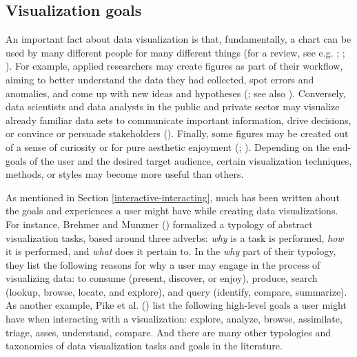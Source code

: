 \documentclass[
  openany]{book}
\theoremstyle{definition}
\theoremstyle{definition}
\theoremstyle{definition}
\theoremstyle{definition}
\theoremstyle{remark}
\begin{document}
\subsection{Visualization goals}\label{visualization-goals}

An important fact about data visualization is that, fundamentally, a chart can be used by many different people for many different things (for a review, see e.g. ; ; ). For example, applied researchers may create figures as part of their workflow, aiming to better understand the data they had collected, spot errors and anomalies, and come up with new ideas and hypotheses (; see also ). Conversely, data scientists and data analysts in the public and private sector may visualize already familiar data sets to communicate important information, drive decisions, or convince or persuade stakeholders (). Finally, some figures may be created out of a sense of curiosity or for pure aesthetic enjoyment (; ). Depending on the end-goals of the user and the desired target audience, certain visualization techniques, methods, or styles may become more useful than others.

As mentioned in Section \ref{interactive-interacting}, much has been written about the goals and experiences a user might have while creating data visualizations. For instance, Brehmer and Munzner () formalized a typology of abstract visualization tasks, based around three adverbs: \emph{why} is a task is performed, \emph{how} it is performed, and \emph{what} does it pertain to. In the \emph{why} part of their typology, they list the following reasons for why a user may engage in the process of visualizing data: to consume (present, discover, or enjoy), produce, search (lookup, browse, locate, and explore), and query (identify, compare, summarize). As another example, Pike et al. () list the following high-level goals a user might have when interacting with a visualization: explore, analyze, browse, assimilate, triage, asses, understand, compare. And there are many other typologies and taxonomies of data visualization tasks and goals in the literature.
\end{document}
